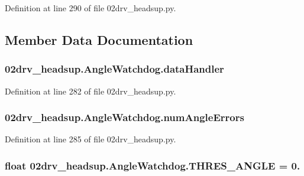 Definition at line 290 of file 02drv\+\_\+headsup.\+py.



\subsection{Member Data Documentation}
\subsubsection[{\texorpdfstring{data\+Handler}{dataHandler}}]{\setlength{\rightskip}{0pt plus 5cm}02drv\+\_\+headsup.\+Angle\+Watchdog.\+data\+Handler}\hypertarget{class02drv__headsup_1_1_angle_watchdog_a01d8445bc9bc297f146e4b2b1ac8c3cf}{}\label{class02drv__headsup_1_1_angle_watchdog_a01d8445bc9bc297f146e4b2b1ac8c3cf}


Definition at line 282 of file 02drv\+\_\+headsup.\+py.

\subsubsection[{\texorpdfstring{num\+Angle\+Errors}{numAngleErrors}}]{\setlength{\rightskip}{0pt plus 5cm}02drv\+\_\+headsup.\+Angle\+Watchdog.\+num\+Angle\+Errors}\hypertarget{class02drv__headsup_1_1_angle_watchdog_adb1811c39b9a7621159c44ac365d806a}{}\label{class02drv__headsup_1_1_angle_watchdog_adb1811c39b9a7621159c44ac365d806a}


Definition at line 285 of file 02drv\+\_\+headsup.\+py.

\subsubsection[{\texorpdfstring{T\+H\+R\+E\+S\+\_\+\+A\+N\+G\+LE}{THRES_ANGLE}}]{\setlength{\rightskip}{0pt plus 5cm}float 02drv\+\_\+headsup.\+Angle\+Watchdog.\+T\+H\+R\+E\+S\+\_\+\+A\+N\+G\+LE = 0.\hspace{0.3cm}{\ttfamily [static]}}\hypertarget{class02drv__headsup_1_1_angle_watchdog_a87839c1f430c8213859fc04ccc21c877}{}\label{class02drv__headsup_1_1_angle_watchdog_a87839c1f430c8213859fc04ccc21c877}


